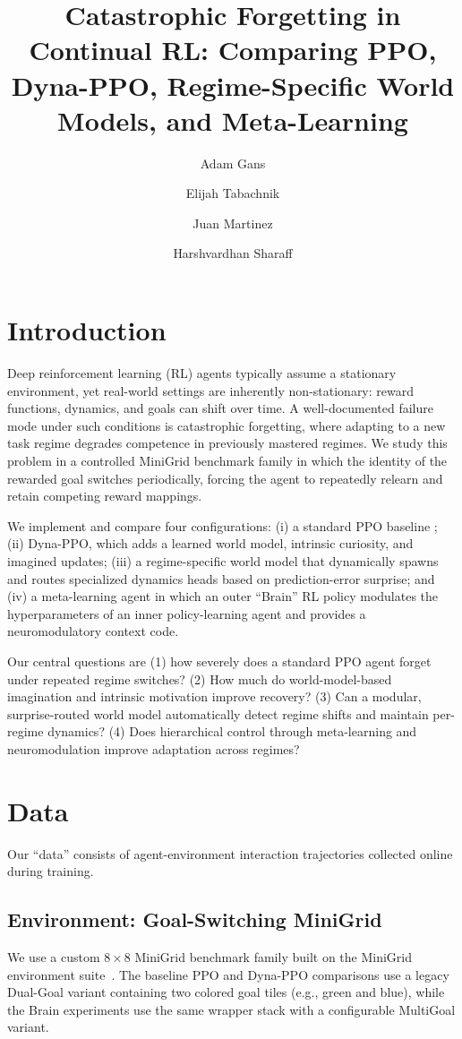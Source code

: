 ﻿\documentclass[sigconf]{acmart}
\title{Catastrophic Forgetting in Continual RL: Comparing PPO, Dyna-PPO, Regime-Specific World Models, and Meta-Learning}
\author{Adam Gans}
\affiliation{
  \institution{University Of California, Irvine}
  \city{Irvine}
  \state{California}
  \country{USA}
}
\author{Elijah Tabachnik}
\affiliation{
  \institution{University Of California, Irvine}
  \city{Irvine}
  \state{California}
  \country{USA}
}
\author{Juan Martinez}
\affiliation{
  \institution{University Of California, Irvine}
  \city{Irvine}
  \state{California}
  \country{USA}
}
\author{Harshvardhan Sharaff}
\affiliation{
  \institution{University Of California, Irvine}
  \city{Irvine}
  \state{California}
  \country{USA}
}
\begin{document}
\maketitle

\section{Introduction}
Deep reinforcement learning (RL) agents typically assume a stationary environment, yet real-world settings are inherently non-stationary: reward functions, dynamics, and goals can shift over time. A well-documented failure mode under such conditions is catastrophic forgetting, where adapting to a new task regime degrades competence in previously mastered regimes. We study this problem in a controlled MiniGrid benchmark family in which the identity of the rewarded goal switches periodically, forcing the agent to repeatedly relearn and retain competing reward mappings.

We implement and compare four configurations: (i) a standard PPO baseline \cite{schulman2017ppo}; (ii) Dyna-PPO, which adds a learned world model, intrinsic curiosity, and imagined updates; (iii) a regime-specific world model that dynamically spawns and routes specialized dynamics heads based on prediction-error surprise; and (iv) a meta-learning agent in which an outer ``Brain'' RL policy modulates the hyperparameters of an inner policy-learning agent and provides a neuromodulatory context code.

Our central questions are (1) how severely does a standard PPO agent forget under repeated regime switches? (2) How much do world-model-based imagination and intrinsic motivation improve recovery? (3) Can a modular, surprise-routed world model automatically detect regime shifts and maintain per-regime dynamics? (4) Does hierarchical control through meta-learning and neuromodulation improve adaptation across regimes?

\section{Data}
\label{sec:data}
Our ``data'' consists of agent-environment interaction trajectories collected online during training.

\subsection{Environment: Goal-Switching MiniGrid}
We use a custom $8 \times 8$ MiniGrid benchmark family built on the MiniGrid environment suite~\cite{chevalierboisvert2023minigrid}. The baseline PPO and Dyna-PPO comparisons use a legacy Dual-Goal variant containing two colored goal tiles (e.g., green and blue), while the Brain experiments use the same wrapper stack with a configurable MultiGoal variant.
\end{document}
